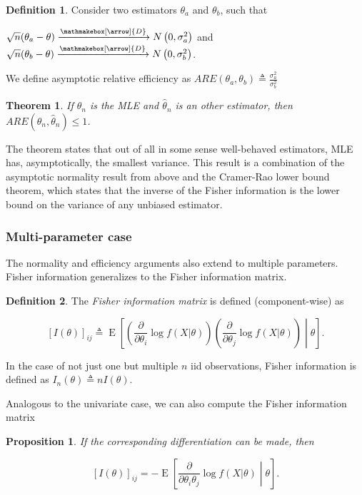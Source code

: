 \documentclass{book}
\theoremstyle{plain}%
\newtheorem{theorem}{Theorem}[section]
\newtheorem{proposition}{Proposition}[section]
\theoremstyle{definition}
\newtheorem{definition}{Definition}[section]
\DeclareMathOperator{\E}{E}
\newlength{\arrow}
\newcommand*{\myrightarrow}[1]{\xrightarrow{\mathmakebox[\arrow]{#1}}}
\begin{document}
\begin{definition}
Consider two estimators $\theta_a$ and $\theta_b$, such that

$\sqrt{n}(\theta_a - \theta) \myrightarrow{D} N\left(0, \sigma^2_a\right)$ and $\sqrt{n}(\theta_b - \theta) \myrightarrow{D} N\left(0, \sigma^2_b\right)$.

We define asymptotic relative efficiency as $ARE(\theta_a, \theta_b) \triangleq \frac{\sigma^2_a}{\sigma^2_b}$

\end{definition}

\begin{theorem} If $\theta_n$ is the MLE and $\hat{\theta}_n$ is an other estimator, then $ARE(\theta_n, \hat{\theta}_n) \leq 1$.
\end{theorem}

The theorem states that out of all in some sense well-behaved estimators, MLE has, asymptotically, the smallest variance. This result is a combination of the asymptotic normality result from above and the Cramer-Rao lower bound theorem, which states that the inverse of the Fisher information is the lower bound on the variance of any unbiased estimator.

\subsubsection*{Multi-parameter case}

The normality and efficiency arguments also extend to multiple parameters. Fisher information generalizes to the Fisher information matrix.


\begin{definition} The \emph{Fisher information matrix} is defined (component-wise) as 

$$[I(\theta)]_{ij} \triangleq \E\left[\left(\frac{\partial}{\partial \theta_i} \log f(X|\theta)\right)\left(\frac{\partial}{\partial \theta_j} \log f(X|\theta)\right)   \middle| \theta\right].$$

In the case of not just one but multiple $n$ iid observations, Fisher information is defined as $I_n(\theta) \triangleq nI(\theta)$.
\end{definition}

Analogous to the univariate case, we can also compute the Fisher information matrix

\begin{proposition}
If the corresponding differentiation can be made, then

$$[I(\theta)]_{ij} = - \E\left[\frac{\partial}{\partial \theta_i\theta_j} \log f(X|\theta)\middle| \theta\right].$$

\label{prop:fin}
\end{proposition}
\end{document}
